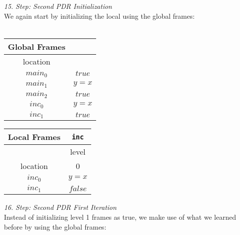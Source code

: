 \documentclass{article}
\begin{document}
	\textsl{15. Step: Second PDR Initialization} \\
	We again start by initializing the local using the global frames: \\ \\
	\begin{minipage}{.4\textwidth}
	\setlength\tabcolsep{0.35em}
	\begin{center}
		\begin{tabu}{cc}
			Global Frames \\
			\toprule
			location &  \\
			$main_0$ & $true$  \\
			$main_1$ & $y = x$\\
			$main_2$ & $true$ \\
			$inc_0$ & $y = x$  \\
			$inc_1$ & $true$\\
			\bottomrule
		\end{tabu}
	\end{center}
\end{minipage}
	\hfill
	\begin{minipage}{.5\textwidth}
		\setlength\tabcolsep{0.35em}
		\begin{center}
			\begin{tabu}{cc}
				Local Frames & \texttt{inc}\\
				\toprule
				& level \\
				\cmidrule(lr){2-2}
				location & 0  \\
				\cmidrule{1-2}
				$inc_0$ & $y = x$  \\
				$inc_1$ & $false$ \\
				\bottomrule
			\end{tabu}
		\end{center}	
	\end{minipage} 

\vspace*{2em}

\textsl{16. Step: Second PDR First Iteration} \\
Instead of initializing level 1 frames as true, we make use of what we learned before by using the global frames: \\
\end{document}
